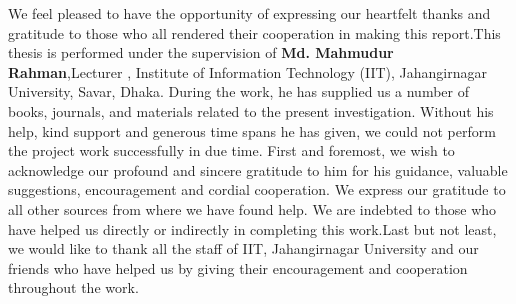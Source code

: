 We feel pleased to have the opportunity of expressing our heartfelt thanks and gratitude to those who all rendered their cooperation in making this report.This thesis is performed under the supervision of \textbf{Md. Mahmudur Rahman},Lecturer , Institute of Information Technology (IIT), Jahangirnagar University, Savar, Dhaka. During the work, he has supplied us a number of books, journals, and materials related to the present investigation. Without his help, kind support and generous time spans he has given, we could not perform the project work successfully in due time. First and foremost, we wish to acknowledge our profound and sincere gratitude to him for his guidance, valuable suggestions, encouragement and cordial cooperation. We express our gratitude to all other sources from where we have found help. We are indebted to those who have helped us directly or indirectly in completing this work.Last but not least, we would like to thank all the staff of IIT, Jahangirnagar University and our friends who have helped us by giving their encouragement and cooperation throughout the work.